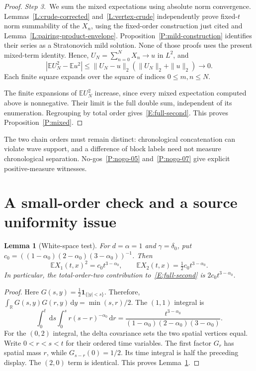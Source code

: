 \documentclass[12pt,oneside,openany]{book}
\makeatletter
\let\lean@pending\@empty
\newcommand{\LeanMarker}[1]{\gdef\lean@pending{#1}}
\numberwithin{equation}{section}
\newtheorem{lemma}[theorem]{Lemma}
\theoremstyle{nogostyle}
\theoremstyle{definition}
\newcommand{\R}{\mathbb{R}}
\newcommand{\E}{\mathbb{E}}
\newcommand{\ud}{\,\mathrm{d}}
\makeatother
\begin{document}
\begin{proof}
  \medskip
  \noindent\textit{Step 3.~}We sum the mixed expectations using absolute norm
  convergence.
  Lemmas~\ref{L:crude-corrected} and~\ref{L:vertex-crude} independently prove
  fixed-$t$ norm summability of the $X_n$, using the fixed-order construction
  just cited and Lemma~\ref{L:pairing-product-envelope}.
  Proposition~\ref{P:mild-construction} identifies their series as a
  Stratonovich mild solution. None of those proofs uses the present mixed-term
  identity. Hence, $U_N = \sum_{n=0}^N X_n \to u$ in $L^2$, and
  \[
    |\E U_N^2-\E u^2|
    \le\|U_N-u\|_2(\|U_N\|_2+\|u\|_2)\longrightarrow0.
  \]
  Each finite square expands over the square of indices $0\le m,n\le N$.

  The finite expansions of $\E U_N^2$ increase, since every mixed expectation
  computed above is nonnegative. Their limit is the full double sum, independent
  of its enumeration. Regrouping by total order gives~\eqref{E:full-second}.
  This proves Proposition~\ref{P:mixed}.
\end{proof}

The two chain orders must remain distinct: chronological concatenation can
violate wave support, and a difference of block labels need not measure
chronological separation. No-gos~\ref{P:nogo-05} and~\ref{P:nogo-07}
give explicit positive-measure witnesses.




\section{A small-order check and a source uniformity issue}

\LeanMarker{L:white-test}
\begin{lemma}[White-space test]\label{L:white-test}
  For $d = \alpha = 1$ and $\gamma = \delta_0$, put $c_0 =
  ((1-\alpha_0)(2-\alpha_0)(3-\alpha_0))^{-1}$. Then
  \begin{equation}\label{E:white-test}
    \E X_1(t,x)^2=c_0t^{3-\alpha_0},\qquad
    \E X_2(t,x)=\tfrac12c_0t^{3-\alpha_0}.
  \end{equation}
  In particular, the total-order-two contribution to~\eqref{E:full-second} is
  $2c_0t^{3-\alpha_0}$.
\end{lemma}

\begin{proof}
  Here $G(s,y) = \frac12\mathbf1_{\{|y|<s\}}$. Therefore, $\int_\R
  G(s,y)G(r,y)\ud y = \min(s,r)/2$. The $(1,1)$ integral is
  \[
    \int_0^t\ud s\int_0^s r(s-r)^{-\alpha_0}\ud r
    =\frac{t^{3-\alpha_0}}
    {(1-\alpha_0)(2-\alpha_0)(3-\alpha_0)}.
  \]
  For the $(0,2)$ integral, the delta covariance sets the two spatial vertices
  equal. Write $0 < r < s < t$ for their ordered time variables. The first
  factor $G_r$ has spatial mass $r$, while $G_{s-r}(0) = 1/2$. Its time integral
  is half the preceding display. The $(2,0)$ term is identical. This proves
  Lemma~\ref{L:white-test}.
\end{proof}
\end{document}
